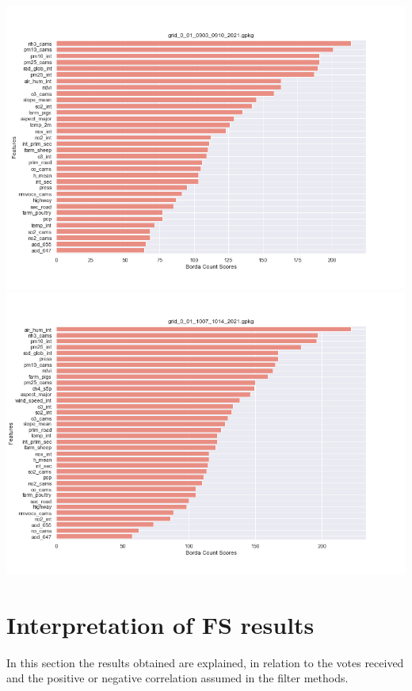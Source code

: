 \begin{center}
\includegraphics[width=.9\textwidth]{images/fs_results/nh3/001/no_montains/grid_0_01_0903_0910_2021.png}
\includegraphics[width=.9\textwidth]{images/fs_results/nh3/001/no_montains/grid_0_01_1007_1014_2021.png}
\end{center}
\section{Interpretation of FS results}
In this section the results obtained are explained, in relation to the votes received and the positive or negative correlation assumed in the filter methods.
